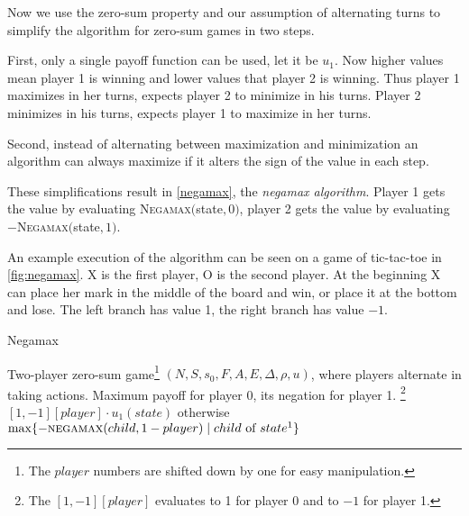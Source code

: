 Now we use the zero-sum property and our assumption of alternating turns
to simplify the algorithm for zero-sum games in two steps.

First, only a single payoff function can be used,
let it be $u_1$. Now higher values mean player 1 is winning and lower
values that player 2 is winning.
Thus player 1 maximizes in her turns, expects
player 2 to minimize in his turns.
Player 2 minimizes in his turns, expects
player 1 to maximize in her turns.

Second, instead of alternating between maximization and minimization an algorithm
can always maximize if it alters the sign of the value in each step.

These simplifications result in \autoref{negamax}, the {\em negamax
algorithm}.
Player 1 gets the value by evaluating
\textsc{Negamax}$($state$, 0)$,
player 2 gets the value by evaluating $-$\textsc{Negamax}$($state$, 1)$.

An example execution of the algorithm can be seen on a game of
tic-tac-toe in \autoref{fig:negamax}.
X is the first player, O is the second player. At the beginning X can
place her mark in the middle of the board and win, or place it at the
bottom and lose. The left branch has value 1, the right branch has value
$-1$.


\begin{algorithm}
\caption{Negamax}
\label{negamax}
\begin{algorithmic}
\Input Two-player zero-sum game\footnote{The $player$
numbers are shifted down by one for easy manipulation.}
$(N, S, s_0, F, A, E, \Delta, \rho, u)$, where players
 alternate in taking actions.
\Output Maximum payoff for player 0, its negation for player 1.
    \State \Return\footnote{The
    $[1,-1][player]$ evaluates to 1 for player 0 and to $-1$ for player 1.}
        $[1,-1][player] \cdot u_1(state)$
        otherwise
    \EndIf
    \State \Return $\max \{ - \Call{negamax}{child, 1 - player}
        \mid
        child \text{ of } state\footnote{Precisely
        for all enabled actions $a \in E(state)$ every $child \in \Delta(state, a)$.}
    \}$
\EndFunction
\end{algorithmic}
\end{algorithm}

